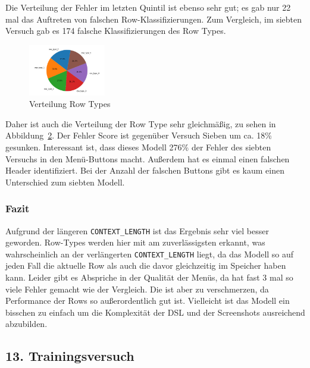 \documentclass[pdftex,a4paper,halfparskip, article]{scrartcl}
\begin{document}
\begin{figure}
\begin{minipage}{.33\textwidth}
  \label{fig:fehler_schlechteste20_bin15}
\end{minipage}
\end{figure}

Die Verteilung der Fehler im letzten Quintil ist ebenso sehr gut; es gab nur 22 mal das Auftreten von falschen Row-Klassifizierungen. Zum Vergleich, im siebten Versuch gab es 174 falsche Klassifizierungen des Row Types.

\begin{figure}[h]
\centering
\includegraphics[width=0.3\textwidth]{predictions_bin15_predicted_row_type_distribution}
\caption{Verteilung Row Types}
\label{fig:bin15_row_type}
\end{figure}

Daher ist auch die Verteilung der Row Type sehr gleichmäßig, zu sehen in Abbildung~\ref{fig:bin15_row_type}. 
Der Fehler Score ist gegenüber Versuch Sieben um ca. 18\% gesunken. 
Interessant ist, dass dieses Modell 276\% der Fehler des siebten Versuchs in den Menü-Buttons macht. Außerdem hat es einmal einen falschen Header identifiziert. Bei der Anzahl der falschen Buttons gibt es kaum einen Unterschied zum siebten Modell.

\subsubsection*{Fazit}
Aufgrund der längeren \texttt{CONTEXT\_LENGTH} ist das Ergebnis sehr viel besser geworden. Row-Types werden hier mit am zuverlässigsten erkannt, was wahrscheinlich an der verlängerten \texttt{CONTEXT\_LENGTH} liegt, da das Modell so auf jeden Fall die aktuelle Row als auch die davor gleichzeitig im Speicher haben kann. Leider gibt es Abspriche in der Qualität der Menüs, da hat fast 3 mal so viele Fehler gemacht wie der Vergleich. Die ist aber zu verschmerzen, da Performance der Rows so außerordentlich gut ist. Vielleicht ist das Modell ein bisschen zu einfach um die Komplexität der DSL und der Screenshots ausreichend abzubilden. 

\subsection{13. Trainingsversuch}
\end{document}
